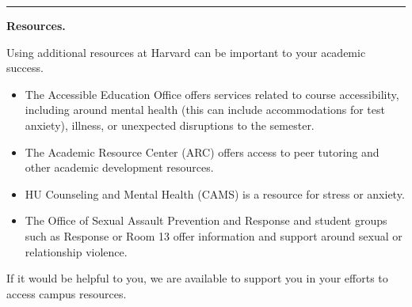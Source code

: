 \documentclass[12pt,letterpaper]{exam}
\begin{document}
\vspace{0.5cm}
\hrule
\vspace{0.5cm}

\noindent\textbf{Resources.}

Using additional resources at Harvard can be important to your academic success. 
\begin{itemize}
    \item The Accessible Education Office offers services related to course accessibility, including around mental health (this can include accommodations for test anxiety), illness, or unexpected disruptions to the semester.
    \item The Academic Resource Center (ARC) offers access to peer tutoring and other academic development resources.
    \item HU Counseling and Mental Health (CAMS) is a resource for stress or anxiety.  
    \item The Office of Sexual Assault Prevention and Response and student groups such as Response or Room 13 offer information and support around sexual or relationship violence.  
\end{itemize}  
If it would be helpful to you, we are available to support you in your efforts to access campus resources.  

\printbibliography[title={Course References}]
\eject




\end{document}
